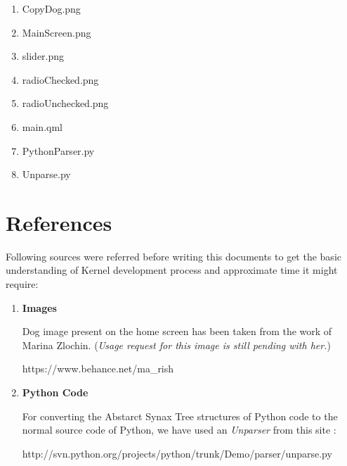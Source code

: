\documentclass[11pt]{article}
\begin{document}
\begin{enumerate}

\item CopyDog.png

 \item MainScreen.png
 
  \item slider.png
  	
\item radioChecked.png

\item radioUnchecked.png

\item main.qml

\item PythonParser.py

\item Unparse.py

\end{enumerate}

\vspace{ 3 mm}


\section{References}
 
Following sources were referred before writing this documents to get the basic understanding of Kernel development process and approximate time it might require:
 
\vspace {3 mm}

 
 \begin{enumerate}
 
 \item  
 
 \textbf{ Images}
 
Dog image present on the home screen has been taken from the work of Marina Zlochin. (\emph{Usage request for this image is still pending with her.})
 
 {https://www.behance.net/ma\_rish}
 
 \vspace {5 mm}
 

 
 \item  \textbf{ Python Code} 
 
 For converting the Abstarct Synax Tree structures of Python code to the normal source code of Python, we have used an \emph{Unparser} from this site :
 
 { http://svn.python.org/projects/python/trunk/Demo/parser/unparse.py}
 

 

 
 
 \end{enumerate} 
\end{document}

